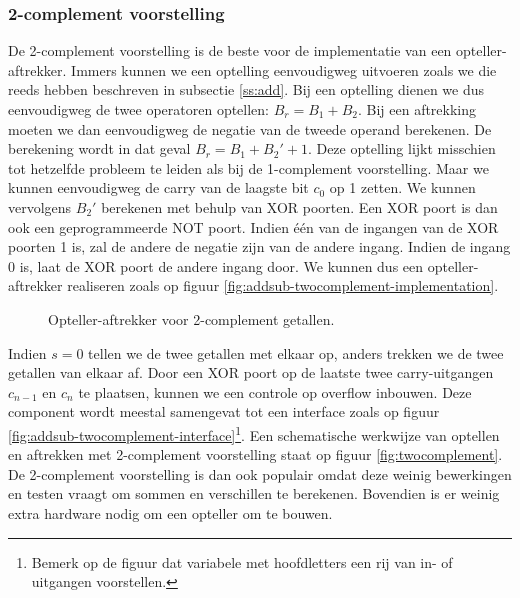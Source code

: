 \subsubsection{2-complement voorstelling}
De 2-complement voorstelling is de beste voor de implementatie van een opteller-aftrekker. Immers kunnen we een optelling eenvoudigweg uitvoeren zoals we die reeds hebben beschreven in subsectie \ref{ss:add}. Bij een optelling dienen we dus eenvoudigweg de twee operatoren optellen: $B_r=B_1+B_2$. Bij een aftrekking moeten we dan eenvoudigweg de negatie van de tweede operand berekenen. De berekening wordt in dat geval $B_r=B_1+B_2'+1$. Deze optelling lijkt misschien tot hetzelfde probleem te leiden als bij de 1-complement voorstelling. Maar we kunnen eenvoudigweg de carry van de laagste bit $c_0$ op 1 zetten. We kunnen vervolgens $B_2'$ berekenen met behulp van XOR poorten. Een XOR poort is dan ook een geprogrammeerde NOT poort. Indien \'e\'en van de ingangen van de XOR poorten 1 is, zal de andere de negatie zijn van de andere ingang. Indien de ingang 0 is, laat de XOR poort de andere ingang door. We kunnen dus een opteller-aftrekker realiseren zoals op figuur \ref{fig:addsub-twocomplement-implementation}.
\begin{figure}[hbt]
\centering
{}
\caption{Opteller-aftrekker voor 2-complement getallen.}
\end{figure}
Indien $s=0$ tellen we de twee getallen met elkaar op, anders trekken we de twee getallen van elkaar af. Door een XOR poort op de laatste twee carry-uitgangen $c_{n-1}$ en $c_n$ te plaatsen, kunnen we een controle op overflow inbouwen. Deze component wordt meestal samengevat tot een interface zoals op figuur \ref{fig:addsub-twocomplement-interface}\footnote{Bemerk op de figuur dat variabele met hoofdletters een rij van in- of uitgangen voorstellen.}. Een schematische werkwijze van optellen en aftrekken met 2-complement voorstelling staat op figuur \ref{fig:twocomplement}. De 2-complement voorstelling is dan ook populair omdat deze weinig bewerkingen en testen vraagt om sommen en verschillen te berekenen. Bovendien is er weinig extra hardware nodig om een opteller om te bouwen.
